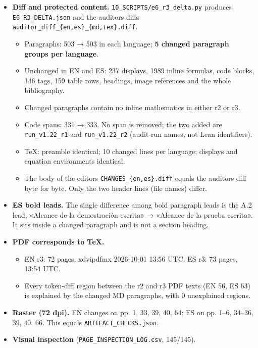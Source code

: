 \documentclass[
]{article}
\providecommand{\tightlist}{%
  \setlength{\itemsep}{0pt}\setlength{\parskip}{0pt}}
\begin{document}
\begin{itemize}
\tightlist
\item
  \textbf{Diff and protected content.}
  \texttt{10\_SCRIPTS/e6\_r3\_delta.py} produces
  \texttt{E6\_R3\_DELTA.json} and the auditor\textquotesingle s diffs
  \texttt{auditor\_diff\_\{en,es\}\_\{md,tex\}.diff}.

  \begin{itemize}
  \tightlist
  \item
    Paragraphs: 503 → 503 in each language; \textbf{5 changed paragraph
    groups per language}.
  \item
    Unchanged in EN and ES: 237 displays, 1989 inline formulas, code
    blocks, 146 tags, 159 table rows, headings, image references and the
    whole bibliography.
  \item
    Changed paragraphs contain no inline mathematics in either r2 or r3.
  \item
    Code spans: 331 → 333. No span is removed; the two added are
    \texttt{run\_v1.22\_r1} and \texttt{run\_v1.22\_r2} (audit-run
    names, not Lean identifiers).
  \item
    TeX: preamble identical; 10 changed lines per language; displays and
    equation environments identical.
  \item
    The body of the editor\textquotesingle s
    \texttt{CHANGES\_\{en,es\}.diff} equals the
    auditor\textquotesingle s diff byte for byte. Only the two header
    lines (file names) differ.
  \end{itemize}
\item
  \textbf{ES bold leads.} The single difference among bold paragraph
  leads is the A.2 lead, «Alcance de la demostración escrita» → «Alcance
  de la prueba escrita». It sits inside a changed paragraph and is not a
  section heading.
\item
  \textbf{PDF corresponds to TeX.}

  \begin{itemize}
  \tightlist
  \item
    EN r3: 72 pages, xdvipdfmx 2026-10-01 13:56 UTC. ES r3: 73 pages,
    13:54 UTC.
  \item
    Every token-diff region between the r2 and r3 PDF texts (EN 56, ES
    63) is explained by the changed MD paragraphs, with 0 unexplained
    regions.
  \end{itemize}
\item
  \textbf{Raster (72 dpi).} EN changes on pp. 1, 33, 39, 40, 64; ES on
  pp. 1--6, 34--36, 39, 40, 66. This equals
  \texttt{ARTIFACT\_CHECKS.json}.
\item
  \textbf{Visual inspection} (\texttt{PAGE\_INSPECTION\_LOG.csv},
  145/145).


\end{itemize}
\end{document}

